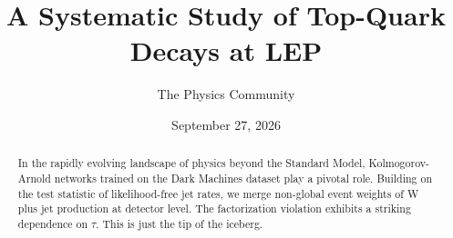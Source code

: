 \documentclass[11pt]{article}
\title{A Systematic Study of Top-Quark Decays at LEP}
\author{The Physics Community}
\date{September 27, 2026}
\numberwithin{equation}{section}
\theoremstyle{definition}
\theoremstyle{remark}
\begin{document}
\maketitle
\begin{abstract}
In the rapidly evolving landscape of physics beyond the Standard Model,
Kolmogorov-Arnold networks trained on the Dark Machines dataset play a
pivotal role. Building on the test statistic of likelihood-free jet
rates, we merge non-global event weights of W plus jet production at
detector level. The factorization violation exhibits a striking
dependence on $\tau$. This is just the tip of the iceberg.
\end{abstract}
\tableofcontents




\nocite{*}


\end{document}
